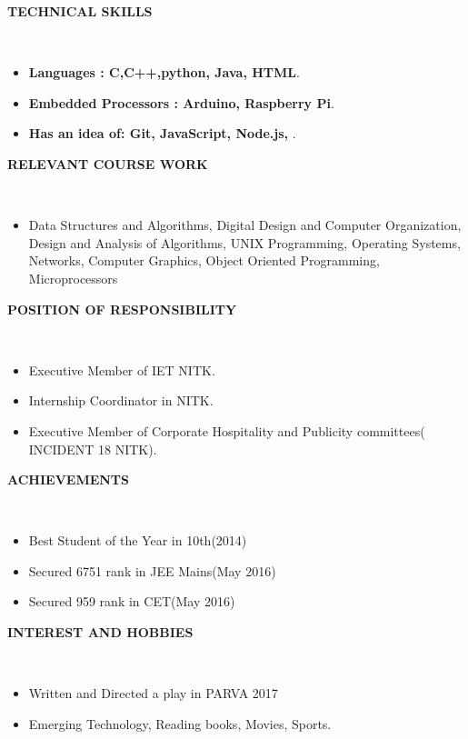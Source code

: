 \documentclass[a4paper,10pt]{article}
\newcommand{\lsep}{-0.5cm}
\newcommand{\resheading}[1]{{\small \colorbox{mygrey}{\begin{minipage}{0.975\textwidth}{\textbf{#1 \vphantom{p\^{E}}}}\end{minipage}}}}
\begin{document}
\resheading{\textbf{TECHNICAL SKILLS} }\\[\lsep]
\begin{itemize}
\item \noindent \textbf{Languages : C,C++,python, Java, HTML}.
\item \noindent \textbf{Embedded Processors : Arduino, Raspberry Pi}.
\item \noindent \textbf{Has an idea of: Git, JavaScript, Node.js, }.
\end{itemize}

\resheading{\textbf{RELEVANT COURSE WORK} }\\[\lsep]
\begin{itemize}
\item \noindent Data Structures and Algorithms, Digital Design and Computer Organization, Design and Analysis of Algorithms, UNIX Programming, Operating Systems, Networks, Computer Graphics, Object Oriented Programming, Microprocessors
\end{itemize}

\resheading{\textbf{POSITION OF RESPONSIBILITY} }\\[\lsep]
\begin{itemize}
\item \noindent Executive Member of IET NITK.
\item \noindent Internship Coordinator in NITK.
\item \noindent Executive Member of Corporate Hospitality and Publicity committees( INCIDENT 18 NITK).
\newline
\newline
\end{itemize}

\resheading{\textbf{ACHIEVEMENTS} }\\[\lsep]
\begin{itemize}
\item \noindent Best Student of the Year in 10th(2014)
\item \noindent Secured 6751 rank in JEE Mains(May 2016)
\item \noindent Secured 959 rank in CET(May 2016)
\end{itemize}


\resheading{\textbf{INTEREST AND HOBBIES} }\\[\lsep]
\begin{itemize}
\item \noindent Written and Directed a play in PARVA 2017
\item \noindent Emerging Technology, Reading books, Movies, Sports.


\end{itemize}
\end{document}

